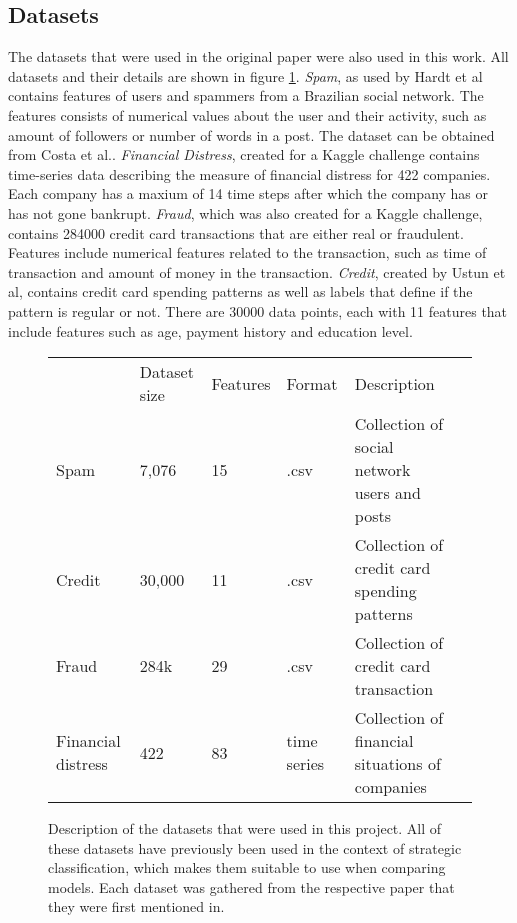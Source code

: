\subsection{Datasets} \label{sec:datasets}
The datasets that were used in the original paper were also used in this work. All datasets and their details are shown in figure \ref{tab:datasets}. 
\textit{Spam}, as used by Hardt et al\cite{hardt2016strategic} contains features of users and spammers from a Brazilian social network. The features consists of numerical values about the user and their activity, such as amount of followers or number of words in a post. The dataset can be obtained from Costa et al.\cite{spam_data}.
\textit{Financial Distress}, created for a Kaggle challenge \cite{financial_distress} contains time-series data describing the measure of financial distress for 422 companies. Each company has a maxium of 14 time steps after which the company has or has not gone bankrupt.
\textit{Fraud}, which was also created for a Kaggle challenge\cite{credit_fraud}, contains 284000 credit card transactions that are either real or fraudulent. Features include numerical features related to the transaction, such as time of transaction and amount of money in the transaction.
\textit{Credit}, created by Ustun et al\cite{ustun2019actionable}, contains credit card spending patterns as well as labels that define if the pattern is regular or not. There are 30000 data points, each with 11 features that include features such as age, payment history and education level.
\begin{figure}[h]
\begin{tabular}{l|l|l|l|l|l}
\cline{2-5}
                                         & Dataset size & Features & Format      & Description                                     &  \\ \cline{1-5}
\multicolumn{1}{|l|}{Spam}               & 7,076             & 15         & .csv        & Collection of social network users and posts          &  \\ \cline{1-5}
\multicolumn{1}{|l|}{Credit}             & 30,000             & 11         & .csv        & Collection of credit card spending patterns     &  \\ \cline{1-5}
\multicolumn{1}{|l|}{Fraud}              & 284k             & 29         & .csv        & Collection of credit card transaction           &  \\ \cline{1-5}
\multicolumn{1}{|l|}{Financial distress} &  422            &  83        & time series & Collection of financial situations of companies &  \\ \cline{1-5}
\end{tabular}
    \caption{Description of the datasets that were used in this project. All of these datasets have previously been used in the context of strategic classification, which makes them suitable to use when comparing models. Each dataset was gathered from the respective paper that they were first mentioned in.}
    \label{tab:datasets}
\end{figure}
